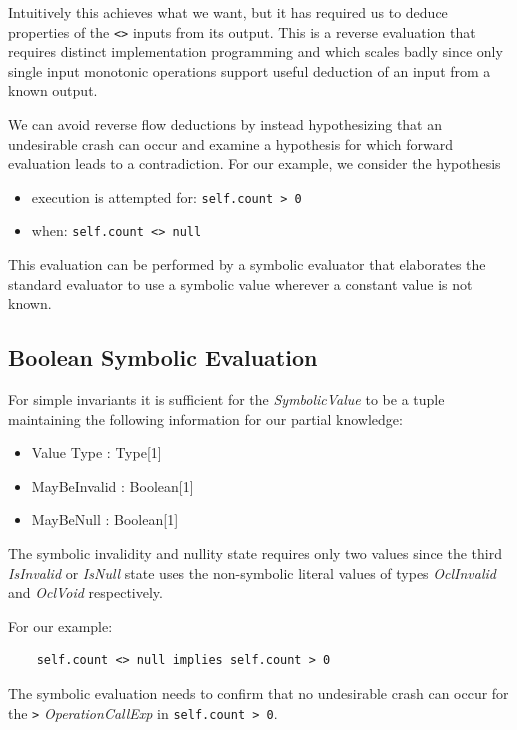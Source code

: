 \documentclass{llncs}
\begin{document}
Intuitively this achieves what we want, but it has required us to deduce properties of the \verb|<>| inputs from its output. This is a reverse evaluation that requires distinct implementation programming and which scales badly since only single input monotonic operations support useful deduction of an input from a known output.

We can avoid reverse flow deductions by instead hypothesizing that an undesirable crash can occur and examine a hypothesis for which forward evaluation leads to a contradiction. For our example, we consider the hypothesis

\begin{itemize}
	\item execution is attempted for: \verb|self.count > 0|
	\item when: \verb|self.count <> null|
\end{itemize}  

This evaluation can be performed by a symbolic evaluator that elaborates the standard evaluator to use a symbolic value wherever a constant value is not known.

\subsection{Boolean Symbolic Evaluation}

For simple invariants it is sufficient for the \emph{SymbolicValue} to be a tuple maintaining the following information for our partial knowledge:
\begin{itemize}
	\item Value Type : Type[1]
	\item MayBeInvalid : Boolean[1]
	\item MayBeNull : Boolean[1]
\end{itemize}

The symbolic invalidity and nullity state requires only two values since the third \emph{IsInvalid} or \emph{IsNull} state uses the non-symbolic literal values of types \emph{OclInvalid} and \emph{OclVoid} respectively.

For our example:

\begin{verbatim}
	self.count <> null implies self.count > 0
\end{verbatim}

The symbolic evaluation needs to confirm that no undesirable crash can occur for the \verb|>| \emph{OperationCallExp} in \verb|self.count > 0|.
\end{document}
